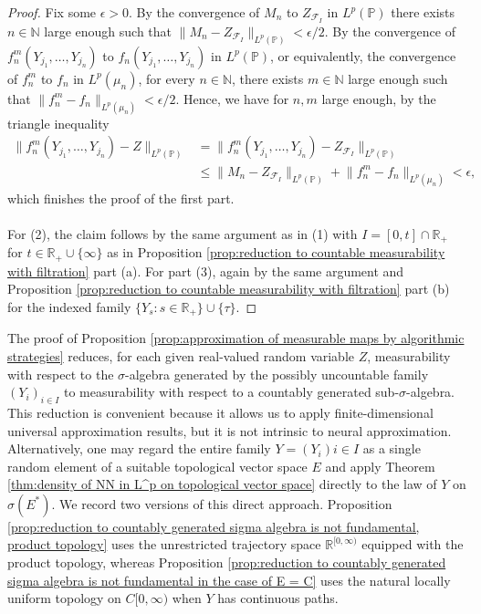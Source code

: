 \documentclass[11pt,a4paper,twoside,openany]{report}
\numberwithin{equation}{section}
\theoremstyle{plain} %
\theoremstyle{definition} %
\theoremstyle{remark} %
\begin{document}
\begin{proof}
Fix some \(\epsilon>0\). By the convergence of \(M_n\) to \(Z_{\mathcal{F}_I}\) in \(L^p(\mathbb{P})\) there exists \(n\in\mathbb{N}\) large enough such that \(\lVert M_n-Z_{\mathcal{F}_I}\rVert_{L^p(\mathbb{P})}<\epsilon/2\). By the convergence of \(f_n^m(Y_{j_1},\dots,Y_{j_n})\) to \(f_n(Y_{j_1},\dots,Y_{j_n})\) in \(L^p(\mathbb{P})\), or equivalently, the convergence of \(f_n^m\) to \(f_n\) in \(L^p(\mu_n)\), for every \(n\in\mathbb{N}\), there exists \(m\in\mathbb{N}\) large enough such that \(\lVert f_n^m-f_n\rVert_{L^p(\mu_n)}<\epsilon/2\). Hence, we have for \(n,m\) large enough, by the triangle inequality
\begin{align*}
    \lVert f_n^m(Y_{j_1},\dots,Y_{j_n})-Z\rVert_{L^p(\mathbb{P})}&= 
    \lVert f_n^m(Y_{j_1},\dots,Y_{j_n})-Z_{\mathcal{F}_I}\rVert_{L^p(\mathbb{P})}
    \\&\leq \lVert M_n-Z_{\mathcal{F}_I}\rVert_{L^p(\mathbb{P})}+\lVert f_n^m-f_n\rVert_{L^p(\mu_n)}<\epsilon,
\end{align*}
which finishes the proof of the first part. \\\\
For (2), the claim follows by the same argument as in (1) with \(I=[0,t]\cap\mathbb{R}_+\) for \(t\in\mathbb{R}_+\cup\{\infty\}\) as in Proposition \ref{prop:reduction to countable measurability with filtration} part (a). For part (3), again by the same argument and Proposition \ref{prop:reduction to countable measurability with filtration} part (b) for the indexed family \(\{Y_s:s\in\mathbb{R}_+\}\cup\{\tau\}\). 
\end{proof}
The proof of Proposition \ref{prop:approximation of measurable maps by algorithmic strategies} reduces, for each given real-valued random variable \(Z\), measurability with respect to the \(\sigma\)-algebra generated by the possibly uncountable family \((Y_i)_{i\in I}\) to measurability with respect to a countably generated sub-\(\sigma\)-algebra. This reduction is convenient because it allows us to apply finite-dimensional universal approximation results, but it is not intrinsic to neural approximation. Alternatively, one may regard the entire family \(Y=(Y_i){i\in I}\) as a single random element of a suitable topological vector space \(E\) and apply Theorem \ref{thm:density of NN in L^p on topological vector space} directly to the law of \(Y\) on \(\sigma(E^*)\). We record two versions of this direct approach. Proposition \ref{prop:reduction to countably generated sigma algebra is not fundamental, product topology} uses the unrestricted trajectory space \(\mathbb R^{[0,\infty)}\) equipped with the product topology, whereas Proposition \ref{prop:reduction to countably generated sigma algebra is not fundamental in the case of E = C} uses the natural locally uniform topology on \(C[0,\infty)\) when \(Y\) has continuous paths.
\end{document}
